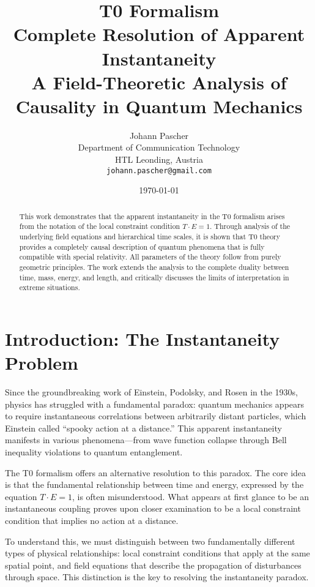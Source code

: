 \documentclass[12pt,a4paper]{article}
\title{{\Huge \color{t0blue}T0 Formalism}\\
	{\LARGE Complete Resolution of Apparent Instantaneity}\\
	\vspace{1cm}
	{\Large A Field-Theoretic Analysis of Causality in Quantum Mechanics}}
\author{{\Large Johann Pascher}\\
	Department of Communication Technology\\
	HTL Leonding, Austria\\
	\texttt{johann.pascher@gmail.com}}
\date{\today}
\begin{document}
	
	\maketitle
	\thispagestyle{empty}
	
	\begin{abstract}
		This work demonstrates that the apparent instantaneity in the T0 formalism arises from the notation of the local constraint condition $T \cdot E = 1$. Through analysis of the underlying field equations and hierarchical time scales, it is shown that T0 theory provides a completely causal description of quantum phenomena that is fully compatible with special relativity. All parameters of the theory follow from purely geometric principles. The work extends the analysis to the complete duality between time, mass, energy, and length, and critically discusses the limits of interpretation in extreme situations.
	\end{abstract}
	
	\newpage
	\hypersetup{linkcolor=blue}
	\tableofcontents
	\newpage
	
	\section{Introduction: The Instantaneity Problem}
	
	Since the groundbreaking work of Einstein, Podolsky, and Rosen in the 1930s, physics has struggled with a fundamental paradox: quantum mechanics appears to require instantaneous correlations between arbitrarily distant particles, which Einstein called ``spooky action at a distance.'' This apparent instantaneity manifests in various phenomena—from wave function collapse through Bell inequality violations to quantum entanglement.
	
	The T0 formalism offers an alternative resolution to this paradox. The core idea is that the fundamental relationship between time and energy, expressed by the equation $T \cdot E = 1$, is often misunderstood. What appears at first glance to be an instantaneous coupling proves upon closer examination to be a local constraint condition that implies no action at a distance.
	
	To understand this, we must distinguish between two fundamentally different types of physical relationships: local constraint conditions that apply at the same spatial point, and field equations that describe the propagation of disturbances through space. This distinction is the key to resolving the instantaneity paradox.
	
\end{document}
